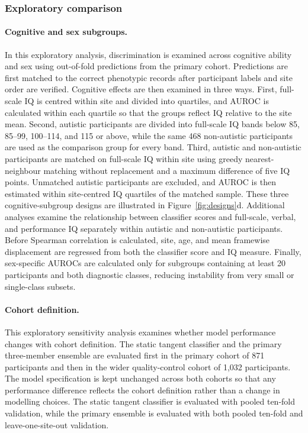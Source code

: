 \subsubsection{Exploratory comparison}
\label{subsubsec:exploratory-comparisons}

\paragraph{\textbf{Cognitive and sex subgroups.}}
\label{par:cognitive-sex-subgroups}
In this exploratory analysis, discrimination is examined across cognitive ability and sex using out-of-fold predictions from the primary cohort. Predictions are first matched to the correct phenotypic records after participant labels and site order are verified. Cognitive effects are then examined in three ways. First, full-scale IQ is centred within site and divided into quartiles, and AUROC is calculated within each quartile so that the groups reflect IQ relative to the site mean. Second, autistic participants are divided into full-scale IQ bands below 85, 85--99, 100--114, and 115 or above, while the same 468 non-autistic participants are used as the comparison group for every band. Third, autistic and non-autistic participants are matched on full-scale IQ within site using greedy nearest-neighbour matching without replacement and a maximum difference of five IQ points. Unmatched autistic participants are excluded, and AUROC is then estimated within site-centred IQ quartiles of the matched sample. These three cognitive-subgroup designs are illustrated in Figure~\ref{fig:designs}d. Additional analyses examine the relationship between classifier scores and full-scale, verbal, and performance IQ separately within autistic and non-autistic participants. Before Spearman correlation is calculated, site, age, and mean framewise displacement are regressed from both the classifier score and IQ measure. Finally, sex-specific AUROCs are calculated only for subgroups containing at least 20 participants and both diagnostic classes, reducing instability from very small or single-class subsets.

\paragraph{\textbf{Cohort definition.}}
\label{par:cohort-definition}
This exploratory sensitivity analysis examines whether model performance changes with cohort definition. The static tangent classifier and the primary three-member ensemble are evaluated first in the primary cohort of 871 participants and then in the wider quality-control cohort of 1,032 participants. The model specification is kept unchanged across both cohorts so that any performance difference reflects the cohort definition rather than a change in modelling choices. The static tangent classifier is evaluated with pooled ten-fold validation, while the primary ensemble is evaluated with both pooled ten-fold and leave-one-site-out validation.


